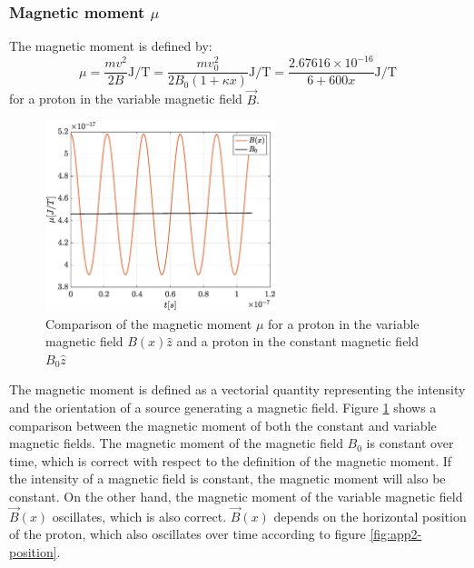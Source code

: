 \documentclass[a4paper,12pt,twoside]{article}
\begin{document}
\subsubsection{Magnetic moment $\mu$} %

The magnetic moment is defined by:
\begin{equation}
\mu = \frac{mv^2}{2B} \si{\joule \per \tesla} = \frac{mv_0^2}{2B_0(1+\kappa x)} \si{\joule \per \tesla} = \frac{2.67616 \times 10^{-16}}{6+600x} \si{\joule \per \tesla}
\end{equation}
for a proton in the variable magnetic field $\vec{B}$.

\begin{figure}[h]
\centering
	\includegraphics[width=0.60\textwidth]{graphs/mu.eps}
	\caption{Comparison of the magnetic moment $\mu$ for a proton in the variable magnetic field $B(x)\hat{z}$ and a proton in the constant magnetic field $B_0\hat{z}$}
	\label{fig:mu}
\end{figure}

The magnetic moment is defined as a vectorial quantity representing the intensity and the orientation of a source generating a magnetic field.\cite{wiki:magnetic-moment}
Figure \ref{fig:mu} shows a comparison between the magnetic moment of both the constant and variable magnetic fields.
The magnetic moment of the magnetic field $B_0$ is constant over time, which is correct with respect to the definition of the magnetic moment.
If the intensity of a magnetic field is constant, the magnetic moment will also be constant.
On the other hand, the magnetic moment of the variable magnetic field $\vec{B}(x)$ oscillates, which is also correct.
$\vec{B}(x)$ depends on the horizontal position of the proton, which also oscillates over time according to figure \ref{fig:app2-position}. 
\end{document}
